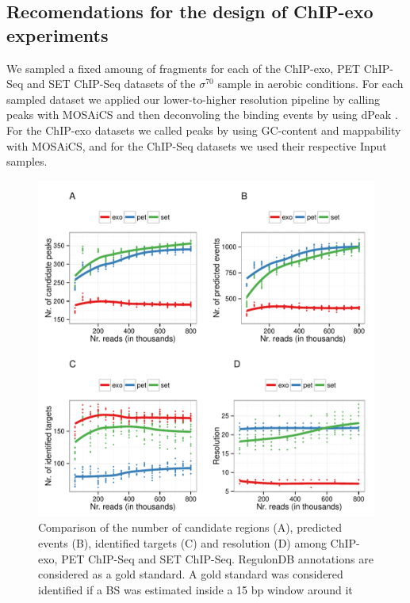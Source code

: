 \documentclass{bmcart}\usepackage[]{graphicx}\usepackage[]{color}
\begin{document}
\subsection{Recomendations for the design of ChIP-exo experiments}
\label{sec:reco}



We sampled a fixed amoung of fragments for each of the ChIP-exo, PET
ChIP-Seq and SET ChIP-Seq datasets of the $\sigma^{70}$ sample in
aerobic conditions. For each sampled dataset we applied our
lower-to-higher resolution pipeline by calling peaks with MOSAiCS
\cite{mosaics} and then deconvoling the binding events by using dPeak
\cite{dpeak}. For the ChIP-exo datasets we called peaks by using
GC-content and mappability with MOSAiCS, and for the ChIP-Seq datasets
we used their respective Input samples.

\begin{figure}[h!]
  \centering
  \includegraphics[width = .8\textwidth]{../figs/for_paper/Sig70_aerobic_saturation.pdf}
  \caption{Comparison of the number of candidate regions (A),
    predicted events (B), identified targets (C) and resolution (D)
    among ChIP-exo, PET ChIP-Seq and SET ChIP-Seq. RegulonDB
    annotations are considered as a gold standard. A gold standard was
    considered identified if a BS was estimated inside a 15
    bp window around it}
  \label{fig:design}
\end{figure}
\end{document}
